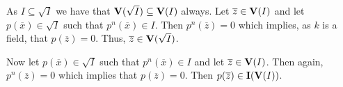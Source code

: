 \documentclass[letterpaper, 11pt, oneside]{book}
\begin{document}
\begin{sol}\label{ex:Curves_1.18}
\end{sol}

\begin{sol}\label{ex:Curves_1.20}
  As $I \subseteq \sqrt{I}$ we have that $\operatorname{\mathbf{V}}(\sqrt{I}) \subseteq \operatorname{\mathbf{V}}(I)$ always.
  Let $\overline{z} \in \operatorname{\mathbf{V}}(I)$ and let $p(\overline{x}) \in \sqrt{I}$ such that $p^{n}(\overline{x}) \in I$.
  Then $p^{n}(\overline{z}) = 0$ which implies, as $k$ is a field, that $p(\overline{z}) = 0$.
  Thus, $\overline{z} \in \operatorname{\mathbf{V}}(\sqrt{I})$.

  Now let $p(\overline{x}) \in \sqrt{I}$ such that $p^{n}(\overline{x}) \in I$ and let $\overline{z} \in \operatorname{\mathbf{V}}(I)$.
  Then again, $p^{n}(\overline{z}) = 0$ which implies that $p(\overline{z}) = 0$.
  Then $p(\overline{z}) \in \operatorname{\mathbf{I}}(\operatorname{\mathbf{V}}(I))$.
\end{sol}

\begin{sol}\label{ex:Curves_1.21}
\end{sol}
\end{document}
